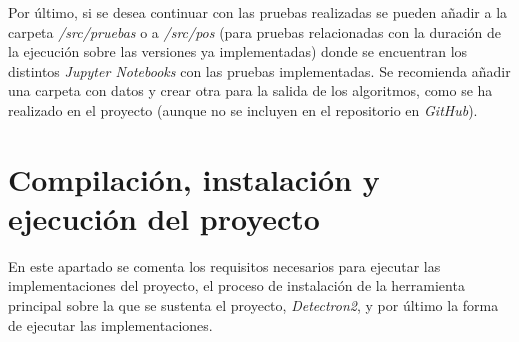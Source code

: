 Por último, si se desea continuar con las pruebas realizadas se pueden añadir a la carpeta \textit{/src/pruebas} o a \textit{/src/pos} (para pruebas relacionadas con la duración de la ejecución sobre las versiones ya implementadas) donde se encuentran los distintos \textit{Jupyter Notebooks} con las pruebas implementadas. Se recomienda añadir una carpeta con datos y crear otra para la salida de los algoritmos, como se ha realizado en el proyecto (aunque no se incluyen en el repositorio en \textit{GitHub}).

\section{Compilación, instalación y ejecución del proyecto}
En este apartado se comenta los requisitos necesarios para ejecutar las implementaciones del proyecto, el proceso de instalación de la herramienta principal sobre la que se sustenta el proyecto, \textit{Detectron2}, y por último la forma de ejecutar las implementaciones.

